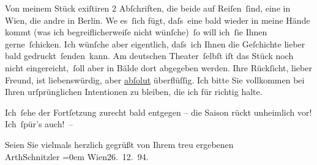 \pstart
           Von meinem Stück exiſtiren 2 Abſchriften,
               die beide auf Reiſen ſind, eine in Wien, die andre
               in Berlin. We{\geminationn}
               es ſich fügt, daſs eine bald wieder {\pb}in meine Hände kommt
               (was ich begreiflicherweiſe nicht wünſche) ſo will ich ſie Ihnen gerne ſchicken. Ich
               wünſche aber eigentlich, daſs ich Ihnen die Geſchichte lieber bald gedruckt ſenden kann. Am deutschen Theater ſelbſt iſt das Stück noch nicht eingereicht, ſoll aber in
               Bälde dort abgegeben werden. Ihre Rückſicht, lieber Freund, ist liebenswürdig, aber
                  \uline{abſolut} überflüſſig. Ich bitte Sie vollkommen {\pb}bei Ihren urſprünglichen Intentionen zu bleiben, die ich
               für richtig halte.\pend
           
\pstart
           Ich ſehe der Fortſetzung zurecht bald entgegen – die Saison rückt unheimlich vor!
               Ich ſpür’s auch! –\pend
           
\pstart
           Seien Sie vielmals herzlich gegrüßt von Ihrem treu ergebenen{\\[\baselineskip]}\spacefill\mbox{ArthSchnitzler}\pend
           \leftskip=0em{}
\pstart
           Wien26. 12. 94.\pend
           \endnumbering{}
\begin{anhang}
\end{anhang}\newcommand{\dateiname}{L03914}\newcommand{\titel}{Arthur Schnitzler an Theodor Herzl, 26. 12. 1894}\newcommand{\editorInnen}{Herausgegeben von Jahnke, SelmaMüller, Martin Anton}
